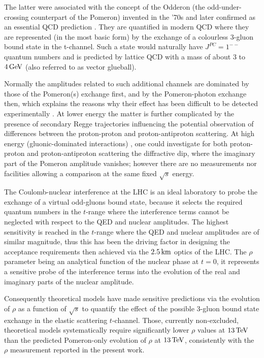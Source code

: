 The latter were associated with the concept of the Odderon (the odd-under-crossing counterpart of the Pomeron) invented in the '70s \cite{nicolescu-1973,nicolescu-1975} and later confirmed as an essential QCD prediction \cite{lipatov-1986}. They are quantified in modern QCD \cite{durham-2015-review} where they are represented (in the most basic form) by the exchange of a colourless 3-gluon bound state in the t-channel. Such a state would naturally have $J^{PC}=1^{--}$ quantum numbers and is predicted by lattice QCD with a mass of about $3$ to $4\,{\rm GeV}$ (also referred to as vector glueball).

Normally the amplitudes related to such additional channels are dominated by those of the Pomeron(s) exchange first, and by the Pomeron-photon exchange then, which explains the reasons why their effect has been difficult to be detected experimentally \cite{hera-odderon-2002}. At lower energy \cite{breakstone-85} the matter is further complicated by the presence of secondary Regge trajectories influencing the potential observation of differences between the proton-proton and proton-antiproton scattering. At high energy (gluonic-dominated interactions) \cite{yellow-report}, one could investigate for both proton-proton and proton-antiproton scattering the diffractive dip, where the imaginary part of the Pomeron amplitude vanishes; however there are no measurements nor facilities allowing a comparison at the same fixed $\sqrt s$ energy.

The Coulomb-nuclear interference at the LHC is an ideal laboratory to probe the exchange of a virtual odd-gluons bound state, because it selects the required quantum numbers in the $t$-range where the interference terms cannot be neglected with respect to the QED and nuclear amplitudes. The highest sensitivity is reached in the $t$-range where the QED and nuclear amplitudes are of similar magnitude, thus this has been the driving factor in designing the acceptance requirements then achieved via the $2.5\,{\rm km}$ optics of the LHC. The $\rho$ parameter being an analytical function of the nuclear phase at $t=0$, it represents a sensitive probe of the interference terms into the evolution of the real and imaginary parts of the nuclear amplitude.

Consequently theoretical models have made sensitive predictions via the evolution of $\rho$ as a function of $\sqrt s$ to quantify the effect of the possible 3-gluon bound state exchange in the elastic scattering $t$-channel. Those, currently non-excluded, theoretical models systematically require significantly lower $\rho$ values at $13\,{\rm TeV}$ than the predicted Pomeron-only evolution of $\rho$ at $13\,{\rm TeV}$, consistently with the $\rho$ measurement reported in the present work.

